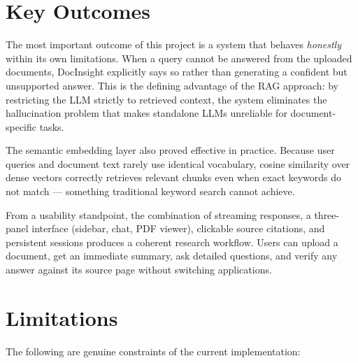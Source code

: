 \section{Key Outcomes}

The most important outcome of this project is a system that behaves
\textit{honestly} within its own limitations. When a query cannot be answered
from the uploaded documents, DocInsight explicitly says so rather than generating
a confident but unsupported answer. This is the defining advantage of the RAG
approach: by restricting the LLM strictly to retrieved context, the system
eliminates the hallucination problem that makes standalone LLMs unreliable for
document-specific tasks.

The semantic embedding layer also proved effective in practice. Because user
queries and document text rarely use identical vocabulary, cosine similarity over
dense vectors correctly retrieves relevant chunks even when exact keywords do not
match --- something traditional keyword search cannot achieve.

From a usability standpoint, the combination of streaming responses, a
three-panel interface (sidebar, chat, PDF viewer), clickable source citations,
and persistent sessions produces a coherent research workflow. Users can upload
a document, get an immediate summary, ask detailed questions, and verify any
answer against its source page without switching applications.

\section{Limitations}

The following are genuine constraints of the current implementation:

